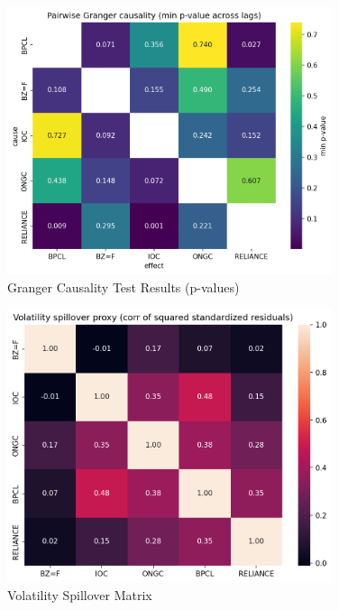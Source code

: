 \documentclass[11pt]{article}
\begin{document}
\begin{figure}[htbp]
\centering
\includegraphics[width=0.85\textwidth]{granger_min_pvalues_heatmap.png}
\caption{Granger Causality Test Results (p-values)}
\label{fig:granger}
\end{figure}

\begin{figure}[htbp]
\centering
\includegraphics[width=0.85\textwidth]{volatility_spillover_heatmap.png}
\caption{Volatility Spillover Matrix}
\label{fig:vol_spillover}
\end{figure}
\end{document}
